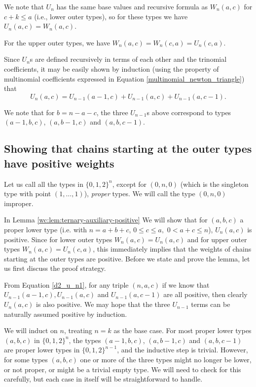 \documentclass[11pt, reqno]{amsart}
\theoremstyle{remark}
\numberwithin{equation}{section}
\newcommand{\un}{U_{n}}
\newcommand{\uno}{U_{n-1}}
\begin{document}
We note that $U_n$ has the same base values and recursive formula as $W_n(a, c)$ for $c+k \leqslant a$ (i.e., lower outer types), so for these types we have $U_n(a, c)=W_n(a, c)$.

For the upper outer types, we have $W_n(a, c)=W_n(c, a)=U_n(c, a)$.

Since $U_n$s are defined recursively in terms of each other and the trinomial coefficients, it may be easily shown by induction (using the property of multinomial coefficients expressed in Equation \ref{multinomial_newton_triangle}) that
\begin{equation}
\label{d2_u_n1}
    U_n(a, c)=\uno(a-1, c)+\uno(a, c)+\uno(a, c-1).
\end{equation}

We note that for $b=n-a-c$, the three $\uno$s above correspond to types $(a-1, b, c)$, $(a, b-1, c)$ and $(a, b, c-1)$.

\subsection{Showing that chains starting at the outer types have positive weights}
\label{d2_outer_positive}

Let us call all the types in $\{0, 1, 2\}^n$, except for $(0, n, 0)$ (which is the singleton type with point $(1, \dots, 1)$), \emph{proper} types. We will call the type $(0, n, 0)$ improper.

In Lemma \ref{wc:lem:ternary-auxiliary-positive} We will show that for $(a, b, c)$ a proper lower type (i.e. with $n=a+b+c$, $0 \leqslant c \leqslant a,$ $0 < a+c \leqslant n$), $U_n(a, c)$ is positive. Since for lower outer types $W_n(a, c)=U_n(a, c)$ and for upper outer types $W_n(a, c)=U_n(c, a)$, this immediately implies that the weights of chains starting at the outer types are positive. Before we state and prove the lemma, let us first discuss the proof strategy.

From Equation \ref{d2_u_n1}, for any triple $(n, a, c)$ if we know that $\uno(a-1, c), \uno(a, c)$ and $\uno(a, c-1)$ are all positive, then clearly $\un(a, c)$ is also positive. We may hope that the three $\uno$ terms can be naturally assumed positive by induction.

We will induct on $n$, treating $n=k$ as the base case. For most proper lower types $(a, b, c)$ in $\{0, 1, 2\}^n$, the types $(a-1, b, c)$, $(a, b-1, c)$ and $(a, b, c-1)$ are proper lower types in $\{0, 1, 2\}^{n-1}$, and the inductive step is trivial. However, for some types $(a, b, c)$ one or more of the three types might no longer be lower, or not proper, or might be a trivial empty type. We will need to check for this carefully, but each case in itself will be straightforward to handle.
\end{document}
